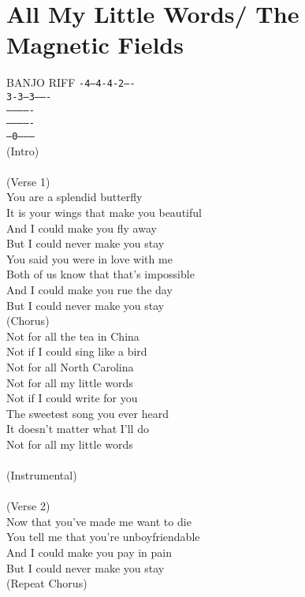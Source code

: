 \section{All My Little Words/ The Magnetic Fields}\label{sec:allmylittlewords}
\Gmajor
\Eminor
\DmajorEasy
\Cmajor

BANJO RIFF
\texttt{-4--4-4-2----}\\
\texttt{3-3--3-------}\\
\texttt{-------------}\\
\texttt{-------------}\\
\texttt{---0---------}\\

(Intro)\\
    \\
(Verse 1)\\
You are a splendid butterfly\\
It is your wings that make you beautiful\\
And I could make you fly away\\
But I could never make you stay\\
You said you were in love with me\\
Both of us know that that's impossible\\
And I could make you rue the day\\
But I could never make you stay\\
(Chorus)\\
Not for all the tea in China \\
Not if I could sing like a bird\\
Not for all North Carolina \\
Not for all my little words\\
Not if I could write for you\\
The sweetest song you ever heard\\
It doesn't matter what I'll do\\
Not for all my little words\\
\\
(Instrumental)\\
    \\
(Verse 2)\\
Now that you've made me want to die\\
You tell me that you're unboyfriendable\\
And I could make you pay in pain\\
But I could never make you stay\\
(Repeat Chorus)

